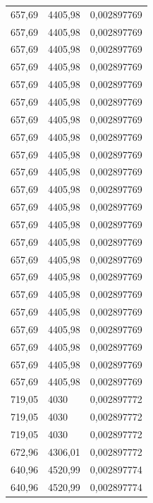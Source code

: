 \begin{center}
\begin{longtable}{|l|l|l|}
657,69            & 4405,98           & 0,002897769 \\
657,69            & 4405,98           & 0,002897769 \\
657,69            & 4405,98           & 0,002897769 \\
657,69            & 4405,98           & 0,002897769 \\
657,69            & 4405,98           & 0,002897769 \\
657,69            & 4405,98           & 0,002897769 \\
657,69            & 4405,98           & 0,002897769 \\
657,69            & 4405,98           & 0,002897769 \\
657,69            & 4405,98           & 0,002897769 \\
657,69            & 4405,98           & 0,002897769 \\
657,69            & 4405,98           & 0,002897769 \\
657,69            & 4405,98           & 0,002897769 \\
657,69            & 4405,98           & 0,002897769 \\
657,69            & 4405,98           & 0,002897769 \\
657,69            & 4405,98           & 0,002897769 \\
657,69            & 4405,98           & 0,002897769 \\
657,69            & 4405,98           & 0,002897769 \\
657,69            & 4405,98           & 0,002897769 \\
657,69            & 4405,98           & 0,002897769 \\
657,69            & 4405,98           & 0,002897769 \\
657,69            & 4405,98           & 0,002897769 \\
657,69            & 4405,98           & 0,002897769 \\
719,05            & 4030              & 0,002897772 \\
719,05            & 4030              & 0,002897772 \\
719,05            & 4030              & 0,002897772 \\
672,96            & 4306,01           & 0,002897772 \\
640,96            & 4520,99           & 0,002897774 \\
640,96            & 4520,99           & 0,002897774 \\

\end{longtable}
\end{center}
